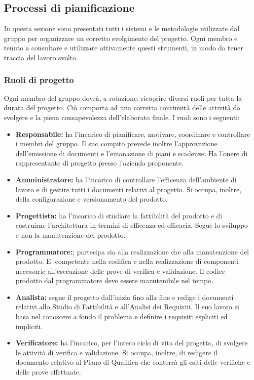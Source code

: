 \subsection{ Processi di pianificazione}
In questa sezione sono presentati tutti i sistemi e le metodologie utilizzate dal gruppo per organizzare un corretto svolgimento del progetto.
Ogni  membro e  tenuto  a  consultare  e utilizzare  attivamente  questi strumenti,  in  modo  da  tener traccia del lavoro svolto.
\subsubsection{Ruoli di progetto}
Ogni membro del gruppo dovrà, a rotazione, ricoprire diversi ruoli per tutta la durata del progetto. Ciò comporta ad una corretta continuità delle attività da svolgere e la piena consapevolezza dell’elaborato finale.
I ruoli sono i seguenti:
\begin{itemize}
\item \textbf{Responsabile:} ha l'incarico di pianificare, motivare, coordinare e controllare i membri del gruppo.
Il suo compito prevede inoltre l'approvazione dell'emissione di documenti e l'emanazione di piani e scadenze.
Ha l'onere di rappresentante di progetto presso l'azienda proponente.
\item \textbf{Amministratore:} ha l'incarico di controllare l'efficenza dell'ambiente di lavoro e di gestire tutti i documenti relativi al progetto. Si occupa, inoltre, della configurazione e versionamento del prodotto.
\item \textbf{Progettista:} ha l'incarico di studiare la fattibilità del prodotto e di costruirne l'architettura in termini di efficenza ed efficacia. Segue lo sviluppo e non la manutenzione del prodotto.
\item \textbf{Programmatore:}; partecipa sia alla realizzazione che alla manutenzione del prodotto. E' competente nella codifica e nella realizzazione di componenti necessarie all’esecuzione delle prove di verifica e validazione. Il codice prodotto dal programmatore deve essere manutenibile nel tempo.
\item \textbf{Analista:} segue il progetto dall'inizio fino alla fine e redige  i documenti relativi allo Studio di Fattibilità e all'Analisi dei Requisiti. Il suo lavoro si basa nel conoscere a fondo il problema e definire i requisiti espliciti ed impliciti.
\item \textbf{Verificatore:} ha l'incarico, per l'intero ciclo di vita del progetto, di svolgere le attività di verifica e validazione. Si occupa, inoltre, di redigere il documento relativo al Piano di Qualifica che conterrà gli esiti delle verifiche e delle prove effettuate.
\end{itemize}

